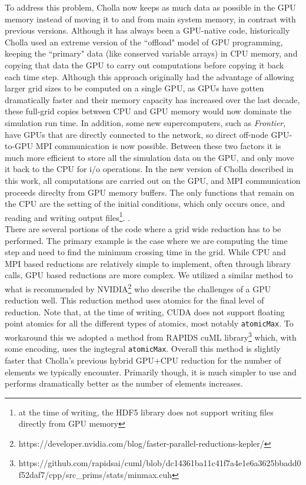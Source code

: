 To address this problem, Cholla now keeps as much data as possible in the GPU memory instead of moving it to and from main system memory, in contrast with previous versions. Although it has always been a GPU-native code, historically Cholla used an extreme version of the ``offload" model of GPU programming, keeping the ``primary" data (like conserved variable arrays) in CPU memory, and copying that data the GPU to carry out computations before copying it back each time step. Although this approach originally had the advantage of allowing larger grid sizes to be computed on a single GPU, as GPUs have gotten dramatically faster and their memory capacity has increased over the last decade, these full-grid copies between CPU and GPU memory would now dominate the simulation run time. In addition, some new supercomputers, such as \textit{Frontier}, have GPUs that are directly connected to the network, so direct off-node GPU-to-GPU MPI communication is now possible. Between these two factors it is much more efficient to store all the simulation data on the GPU, and only move it back to the CPU for i/o operations. In the new version of Cholla described in this work, all computations are carried out on the GPU, and  MPI communication proceeds direclty from GPU memory buffers. The only functions that remain on the CPU are the setting of the initial conditions, which only occurs once, and reading and writing output files\footnote{at the time of writing, the HDF5 library does not support writing files directly from GPU memory}. .\\

There are several portions of the code where a grid wide reduction has to be performed. The primary example is the case where we are computing the time step and need to find the minimum crossing time in the grid. While CPU and MPI based reductions are relatively simple to implement, often through library calls, GPU based reductions are more complex. We utilized a similar method to what is recommended by NVIDIA\footnote{https://developer.nvidia.com/blog/faster-parallel-reductions-kepler/} who describe the challenges of a GPU reduction well. This reduction method uses atomics for the final level of reduction. Note that, at the time of writing, CUDA does not support floating point atomics for all the different types of atomics, most notably \texttt{atomicMax}. To workaround this we adopted a method from RAPIDS cuML library\footnote{https://github.com/rapidsai/cuml/blob/dc14361ba11c41f7a4e1e6a3625bbadd0f52daf7/cpp/src\_prims/stats/minmax.cuh} which, with some encoding, uses the ingtegral \texttt{atomicMax}. Overall this method is slightly faster that Cholla's previous hybrid GPU+CPU reduction for the number of elements we typically encounter. Primarily though, it is much simpler to use and performs dramatically better as the number of elements increases.
